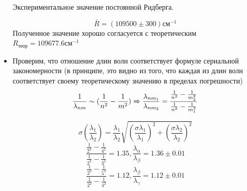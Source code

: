 \documentclass[a4paper,12pt]{article} %
\begin{document}
\begin{itemize}
Экспериментальное значение постоянной Ридберга.

\begin{equation*}
\boxed{
    \bar R = (109500 \pm 300) \text{см}^{-1}}
\end{equation*} 
Полученное значение  хорошо согласуется с теоретическим $R_{\text{теор}} = 109677.6 \text{см}^{-1}$

\item

Проверим, что отношение длин волн соответствует формуле сериальной закономерности (в принципе, это видно из того, что каждая из длин волн соответствует своему теоретическому значению в пределах погрешности)\\
\begin{equation*}
    \frac{1}{\lambda_{nm}} \sim (\frac{1}{n^2} - \frac{1}{m^2})
 \xRightarrow{}  \frac{\lambda_{nm_1}}{\lambda_{nm_2}} = \frac{\frac{1}{n^2} - \frac{1}{m_2^2}}{\frac{1}{n^2} - \frac{1}{m_1^2}}
\end{equation*}

\begin{equation*}
    \sigma(\frac{\lambda_1}{\lambda_2} )= \frac{\lambda_1}{\lambda_2} \sqrt{(\frac{\sigma \lambda_1}{\lambda_1})^2 + (\frac{\sigma \lambda_2}{\lambda_2})^2}
\end{equation*}
\begin{equation*}
    \frac{\frac{1}{2^2} - \frac{1}{4^2}}{\frac{1}{2^2} - \frac{1}{3^2}} = 1.35, \frac{\lambda_\alpha}{\lambda_\beta} = 1.36 \pm 0.01
\end{equation*}
\begin{equation*}
    \frac{\frac{1}{2^2} - \frac{1}{5^2}}{\frac{1}{2^2} - \frac{1}{4^2}} = 1.12, \frac{\lambda_\beta}{\lambda_\gamma} = 1.12 \pm 0.01
\end{equation*}
\end{itemize}
\end{document}
